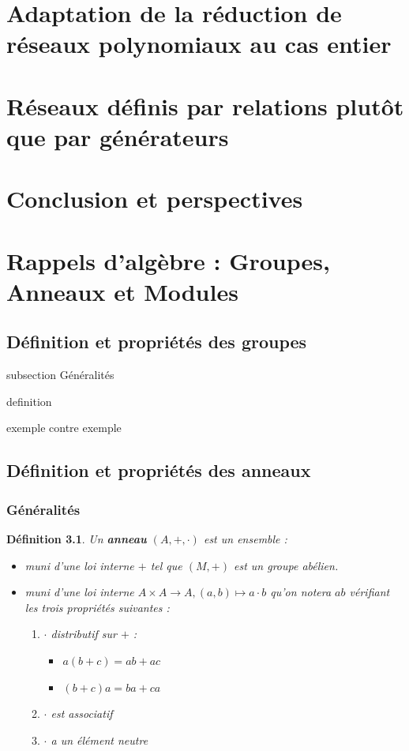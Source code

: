 \documentclass[a4paper,12pt]{report}  %
\theoremstyle{definitionstyle}
\newtheorem{definition}{Définition}[chapter] %
\theoremstyle{examplestyle}
\theoremstyle{remarkstyle}
\theoremstyle{propositionstyle}
\theoremstyle{theoremstyle}
\begin{document}
	\chapter{Adaptation de la réduction de réseaux polynomiaux au cas entier}
	
	\chapter{Réseaux définis par relations plutôt que par générateurs}
	\chapter*{Conclusion et perspectives}
	
	\appendix
	\chapter{Rappels d'algèbre : Groupes, Anneaux et Modules}

	\section{Définition et propriétés des groupes}
	
	
	subsection Généralités
	
	definition
	
	exemple contre exemple
	
	
	\section{Définition et propriétés des anneaux}
	
	\subsection{Généralités}
	
	\begin{definition}
		Un \textbf{anneau} $(A, +, \cdot)$ est un ensemble : 
		\begin{itemize}
			\item muni d'une loi interne $+$ tel que $(M, +)$ est un groupe abélien.
			\item muni d'une loi interne $A \times A \rightarrow A, (a, b) \mapsto a \cdot b$ qu'on notera $ab$ vérifiant les trois propriétés suivantes :
			
			\begin{enumerate}
				\item $\cdot$ distributif sur $+$ :
					\begin{itemize}
						\item $a(b + c) = ab + ac$
						\item $(b+c)a = ba+ca$
					\end{itemize}
				
				
				\item $\cdot$ est associatif
				
				\item $\cdot$ a un élément neutre
			\end{enumerate}
		\end{itemize}
	\end{definition}
\end{document}
